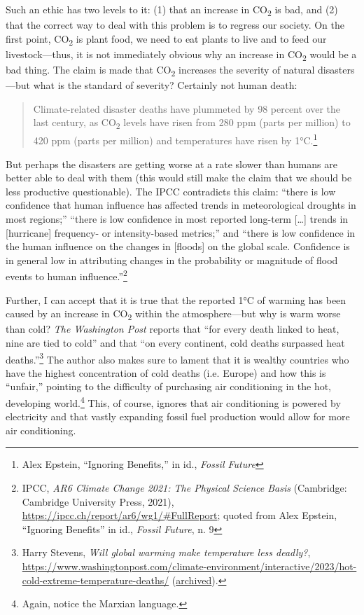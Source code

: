 \documentclass[11pt]{article}
\begin{document}
Such an ethic has two levels to it: (1) that an increase in CO\textsubscript{2} is bad, and (2) that the correct way to deal with this problem is to regress our society. On the first point, CO\textsubscript{2} is plant food, we need to eat plants to live and to feed our livestock---thus, it is not immediately obvious why an increase in CO\textsubscript{2} would be a bad thing. The claim is made that CO\textsubscript{2} increases the severity of natural disasters---but what is the standard of severity? Certainly not human death:

\begin{quote}
Climate-related disaster deaths have plummeted by 98 percent over the last century, as CO\textsubscript{2} levels have risen from 280 ppm (parts per million) to 420 ppm (parts per million) and temperatures have risen by 1°C.\footnote{Alex Epstein, ``Ignoring Benefits,'' in id., \emph{Fossil Future}}
\end{quote}

But perhaps the disasters are getting worse at a rate slower than humans are better able to deal with them (this would still make the claim that we should be less productive questionable). The IPCC contradicts this claim: ``there is low confidence that human influence has affected trends in meteorological droughts in most regions;'' ``there is low confidence in most reported long-term [\ldots{}] trends in [hurricane] frequency- or intensity-based metrics;'' and ``there is low confidence in the human influence on the changes in [floods] on the global scale. Confidence is in general low in attributing changes in the probability or magnitude of flood events to human influence.''\footnote{IPCC, \emph{AR6 Climate Change 2021: The Physical Science Basis} (Cambridge: Cambridge University Press, 2021), \url{https://ipcc.ch/report/ar6/wg1/\#FullReport}; quoted from Alex Epstein, ``Ignoring Benefits'' in id., \emph{Fossil Future}, n. 9}

Further, I can accept that it is true that the reported 1°C of warming has been caused by an increase in CO\textsubscript{2} within the atmosphere---but why is warm worse than cold? \emph{The Washington Post} reports that ``for every death linked to heat, nine are tied to cold'' and that ``on every continent, cold deaths surpassed heat deaths.''\footnote{Harry Stevens, \emph{Will global warming make temperature less deadly?}, \url{https://www.washingtonpost.com/climate-environment/interactive/2023/hot-cold-extreme-temperature-deaths/} (\href{https://archive.ph/o5sHv}{archived}).} The author also makes sure to lament that it is wealthy countries who have the highest concentration of cold deaths (i.e. Europe) and how this is ``unfair,'' pointing to the difficulty of purchasing air conditioning in the hot, developing world.\footnote{Again, notice the Marxian language.} This, of course, ignores that air conditioning is powered by electricity and that vastly expanding fossil fuel production would allow for more air conditioning.
\end{document}
